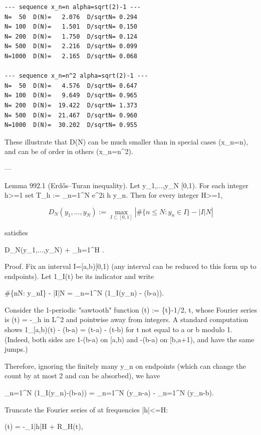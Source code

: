 \begin{verbatim}
--- sequence x_n=n alpha=sqrt(2)-1 ---
N=  50  D(N)=   2.076  D/sqrtN= 0.294
N= 100  D(N)=   1.501  D/sqrtN= 0.150
N= 200  D(N)=   1.750  D/sqrtN= 0.124
N= 500  D(N)=   2.216  D/sqrtN= 0.099
N=1000  D(N)=   2.165  D/sqrtN= 0.068

--- sequence x_n=n^2 alpha=sqrt(2)-1 ---
N=  50  D(N)=   4.576  D/sqrtN= 0.647
N= 100  D(N)=   9.649  D/sqrtN= 0.965
N= 200  D(N)=  19.422  D/sqrtN= 1.373
N= 500  D(N)=  21.467  D/sqrtN= 0.960
N=1000  D(N)=  30.202  D/sqrtN= 0.955
\end{verbatim}

These illustrate that D(N) can be much smaller than  in special cases (x_n=n), and
can be of order  in others (x_n=n^2).

---

Lemma 992.1 (Erd\H{o}s--Turan inequality).
Let y_1,...,y_N \in [0,1). For each integer h>=1 set
  T_h := \sum_{n=1}^N e^{2\pi i h y_n}.
Then for every integer H>=1,

\[
  D_N(y_1,...,y_N)
  := \max_{I\subset[0,1]} \left|\#\{n\le N: y_n\in I\} - |I|N\right|
\]

satisfies

  D_N(y_1,...,y_N) \le {} +  \sum_{h=1}^H .

Proof.
Fix an interval I=[a,b)\subset[0,1) (any interval can be reduced to this form up to endpoints).
Let 1_I(t) be its indicator and write

  \#\{n\le N: y_n\in I\} - |I|N = \sum_{n=1}^N (1_I(y_n) - (b-a)).

Consider the 1-periodic "sawtooth" function
  \psi(t) := \{t\}-1/2,  t\in{},
whose Fourier series is
  \psi(t) = -\sum_{h} 
in L^2 and pointwise away from integers.
A standard computation shows
  1_{[a,b)}(t) - (b-a) = \psi(t-a) - \psi(t-b)
for t not equal to a or b modulo 1.
(Indeed, both sides are 1-(b-a) on [a,b) and -(b-a) on [b,a+1), and have the same jumps.)

Therefore, ignoring the finitely many y_n on endpoints (which can change the count by at
most 2 and can be absorbed), we have

  \sum_{n=1}^N (1_I(y_n)-(b-a)) = \sum_{n=1}^N \psi(y_n-a) - \sum_{n=1}^N \psi(y_n-b).

Truncate the Fourier series of \psi at frequencies |h|<=H:

  \psi(t) = -\sum_{1\le |h|\le H}  + R_H(t),

